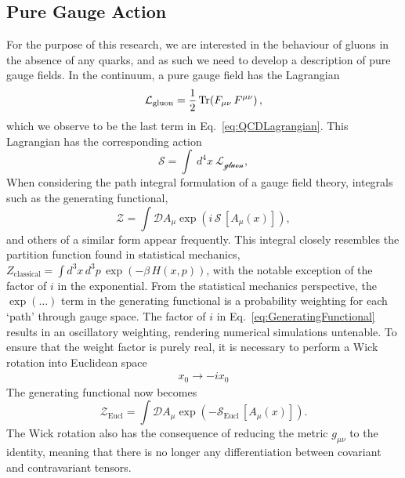\subsection{Pure Gauge Action}
For the purpose of this research, we are interested in the behaviour of gluons in the absence of any quarks, and as such we need to develop a description of pure gauge fields. In the continuum, a pure gauge field has the Lagrangian\cite{ryder1996quantum}
%
\begin{equation}
\mathcal{L}_{\text{gluon}}=\frac{1}{2}\operatorname{Tr}(F_{\mu\nu}\,F^{\mu\nu})\, ,
\label{eq:GaugeLagrangian}
\end{equation}
%
which we observe to be the last term in Eq.~\ref{eq:QCDLagrangian}. This Lagrangian has the corresponding action
%
\begin{equation}
\mathcal{S}=\int~d^4x~\mathcal{L_\text{gluon}},
\label{eq:QCDAction}
\end{equation}
%
When considering the path integral formulation of a gauge field theory, integrals such as the generating functional,
%
\begin{equation}
\mathcal{Z} =\int \mathcal{D} A_\mu \exp\left(i\,\mathcal{S}\,[A_\mu(x)]\right),
\label{eq:GeneratingFunctional}
\end{equation}
%
and others of a similar form appear frequently. This integral closely resembles the partition function found in statistical mechanics, $Z_{\text{classical}}=\int d^3x\,d^3p\,\exp\left(-\beta\,H(x,p)\right)$, with the notable exception of the factor of $i$ in the exponential. From the statistical mechanics perspective, the $\exp(\ldots)$ term in the generating functional is a probability weighting for each `path' through gauge space. The factor of $i$ in Eq.~\ref{eq:GeneratingFunctional} results in an oscillatory weighting, rendering numerical simulations untenable. To ensure that the weight factor is purely real, it is necessary to perform a Wick rotation into Euclidean space\cite{Schafer:1996wv,Wilson:1974sk}
\begin{align*}
x_0\rightarrow -ix_0
\end{align*}
The generating functional now becomes 
\begin{equation}
\mathcal{Z}_{\text{Eucl}} =\int \mathcal{D} A_\mu \exp\left(-\mathcal{S}_{\text{Eucl}}\,[A_\mu(x)]\right).
\end{equation}
The Wick rotation also has the consequence of reducing the metric $g_{\mu\nu}$ to the identity, meaning that there is no longer any differentiation between covariant and contravariant tensors.\\


